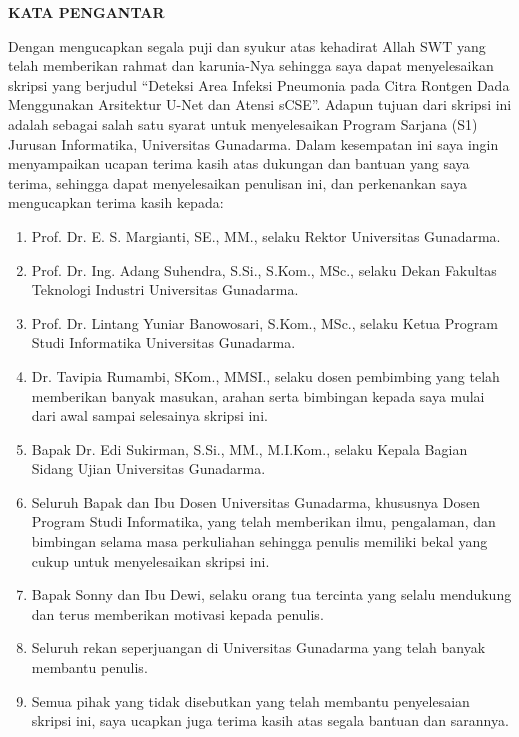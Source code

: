 \documentclass[12pt,a4paper,oneside]{book}
\newcommand{\addfrontmattertoc}[1]{%
  \addtocontents{toc}{\protect\contentsline{chapter}{\textnormal{#1}}{\textnormal{\thepage}}{}}%
}
\begin{document}
\newpage
\thispagestyle{plain}

\begin{center}
  {\bfseries\fontsize{14pt}{14pt}\selectfont\MakeUppercase{Kata Pengantar}}
  \addfrontmattertoc{KATA PENGANTAR}
\end{center}

\vspace{2\baselineskip}  %


Dengan mengucapkan segala puji dan syukur atas kehadirat Allah SWT yang telah memberikan rahmat dan karunia-Nya sehingga saya dapat menyelesaikan skripsi yang berjudul ``Deteksi Area Infeksi Pneumonia pada Citra Rontgen Dada Menggunakan Arsitektur U-Net dan Atensi sCSE''. Adapun tujuan dari skripsi ini adalah sebagai salah satu syarat untuk menyelesaikan Program Sarjana (S1) Jurusan Informatika, Universitas Gunadarma. Dalam kesempatan ini saya ingin menyampaikan ucapan terima kasih atas dukungan dan bantuan yang saya terima, sehingga dapat menyelesaikan penulisan ini, dan perkenankan saya mengucapkan terima kasih kepada:

\begin{enumerate}
  \item Prof. Dr. E. S. Margianti, SE., MM., selaku Rektor Universitas Gunadarma.
  \item Prof. Dr. Ing. Adang Suhendra, S.Si., S.Kom., MSc., selaku Dekan Fakultas Teknologi Industri Universitas Gunadarma.
  \item Prof. Dr. Lintang Yuniar Banowosari, S.Kom., MSc., selaku Ketua Program Studi Informatika Universitas Gunadarma.
  \item Dr. Tavipia Rumambi, SKom., MMSI., selaku dosen pembimbing yang telah memberikan banyak masukan, arahan serta bimbingan kepada saya mulai dari awal sampai selesainya skripsi ini.
  \item Bapak Dr. Edi Sukirman, S.Si., MM., M.I.Kom., selaku Kepala Bagian Sidang Ujian Universitas Gunadarma.
  \item Seluruh Bapak dan Ibu Dosen Universitas Gunadarma, khususnya Dosen Program Studi Informatika, yang telah memberikan ilmu, pengalaman, dan bimbingan selama masa perkuliahan sehingga penulis memiliki bekal yang cukup untuk menyelesaikan skripsi ini.
  \item Bapak Sonny dan Ibu Dewi, selaku orang tua tercinta yang selalu mendukung dan terus memberikan motivasi kepada penulis.
  \item Seluruh rekan seperjuangan di Universitas Gunadarma yang telah banyak membantu penulis.
  \item Semua pihak yang tidak disebutkan yang telah membantu penyelesaian skripsi ini, saya ucapkan juga terima kasih atas segala bantuan dan sarannya.
\end{enumerate}
\end{document}
